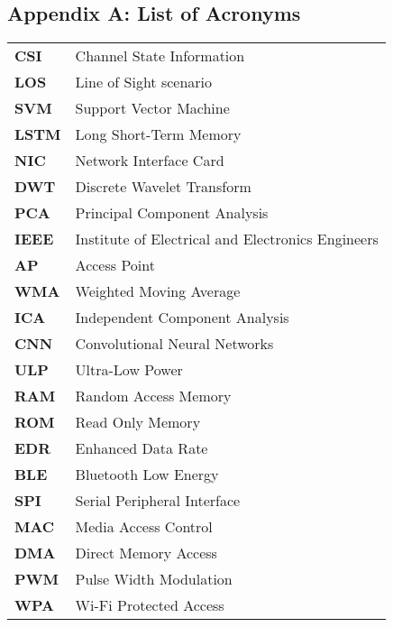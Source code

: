 \begin{appendix}
\makeatletter
{}
\makeatother

\chapter{Appendix A: List of Acronyms}



\begin{table}[H]
\label{tab:appendix}
\centering
\begin{tabular}{ll}


\textbf{CSI}    & Channel State Information             \\
\textbf{LOS}    & Line of Sight scenario                \\
\textbf{SVM}    & Support Vector Machine          \\
\textbf{LSTM}   & Long Short-Term Memory                      \\
\textbf{NIC}    & Network Interface Card                  \\
\textbf{DWT}    & Discrete Wavelet Transform              \\
\textbf{PCA}    & Principal Component Analysis                  \\
\textbf{IEEE}   & Institute of Electrical and Electronics Engineers      \\
\textbf{AP}     & Access Point             \\
\textbf{WMA}    & Weighted Moving Average                       \\
\textbf{ICA}    & Independent Component Analysis  \\
\textbf{CNN}    & Convolutional Neural Networks             \\
\textbf{ULP}    & Ultra-Low Power              \\
\textbf{RAM}   & Random Access Memory                \\
\textbf{ROM}    & Read Only Memory                  \\
\textbf{EDR}   & Enhanced Data Rate   \\
\textbf{BLE}  & Bluetooth Low Energy  \\
\textbf{SPI}  & Serial Peripheral Interface      \\
\textbf{MAC} & Media Access Control           \\
\textbf{DMA}  & Direct Memory Access      \\
\textbf{PWM}  &  Pulse Width Modulation      \\
\textbf{WPA}  &     Wi-Fi Protected Access  \\


\end{tabular}
\end{table}
\end{appendix}
